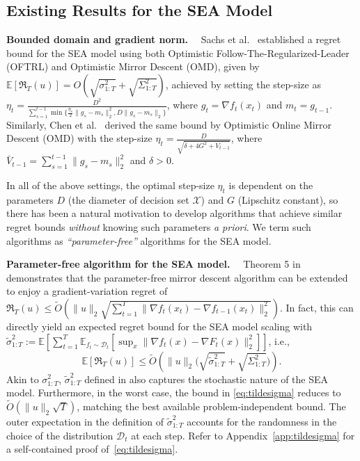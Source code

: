 \documentclass{article}
\renewcommand{\citet}{\citep}
\theoremstyle{plain}
\theoremstyle{definition}
\theoremstyle{remark}
\newcommand{\cD}{\mathcal{D}}
\newcommand{\cX}{\mathcal{X}}
\newcommand{\regret}{\mathfrak{R}}
\renewcommand{\tilde}{\widetilde}
\begin{document}
\subsection{Existing Results for the SEA Model}

\textbf{Bounded domain and gradient norm.}~~  Sachs et al.~\cite{sachs2023accelerated} established a regret bound for the SEA model using both Optimistic Follow-The-Regularized-Leader (OFTRL) and Optimistic Mirror Descent (OMD), given by $\mathbb{E}[\regret_T(u)]= O(\sqrt{\sigma_{1:T}^2}+\sqrt{\Sigma_{1:T}^2})$, achieved by setting the step-size as $\eta_t=\frac{D^2}{\sum_{s=1}^{t-1} \min\{\frac{\eta_s}{2} \|g_s - m_s\|_2^2, D \|g_s - m_s\|_2\}}$, where $g_t=\nabla f_t(x_t)$ and $m_t=g_{t-1}$. Similarly, Chen et al.~\cite{chen2024optimistic} derived the same bound by Optimistic Online Mirror Descent (OMD) with the step-size $\eta_t=\frac{D}{\sqrt{\delta+4G^2+\bar{V}_{t-1}}}$, where $\bar{V}_{t-1}=\sum_{s=1}^{t-1}\|g_s - m_s\|_2^2$ and $\delta>0$.

In all of the above settings, the optimal step-size $\eta_t$ is dependent on the parameters $D$ (the diameter of decision set $\cX$) and $G$ (Lipschitz constant), so there has been a natural motivation to develop algorithms that achieve similar regret bounds \emph{without} knowing such parameters \emph{a priori}. We term such algorithms as \emph{``parameter-free''} algorithms for the SEA model. 

\textbf{Parameter-free algorithm for the SEA model.}~~ Theorem 5 in \citet{jacobsen2022parameter} demonstrates that the parameter-free mirror descent algorithm can be extended to enjoy a gradient-variation regret of $\regret_T(u) \leq \tilde{O}(\|u\|_2 \sqrt{\sum_{t=1}^T \|\nabla f_t(x_t) - \nabla f_{t-1}(x_t)\|_2^2})$. In fact, this can directly yield an expected regret bound for the SEA model scaling with $\tilde{\sigma}_{1:T}^2 := \mathbb{E}\left[\sum_{t=1}^T \mathbb{E}_{f_t \sim \mathcal{D}_t} \left[\sup_x \|\nabla f_t(x) - \nabla F_t(x)\|_2^2\right]\right]$, i.e.,
\begin{equation}\label{eq:tildesigma}
\mathbb{E}[\regret_T(u)]\leq\tilde{O}\left(\|u\|_2 \Big(\sqrt{\tilde{\sigma}_{1:T}^2} + \sqrt{\Sigma_{1:T}^2} \Big)\right).
\end{equation}
Akin to $\sigma_{1:T}^2$, $\tilde{\sigma}_{1:T}^2$ defined in \cite{chen2024optimistic} also captures the stochastic nature of the SEA model. Furthermore, in the worst case, the bound in \eqref{eq:tildesigma} reduces to $\tilde{O}(\|u\|_2 \sqrt{T})$, matching the best available problem-independent bound. The outer expectation in the definition of $\tilde{\sigma}_{1:T}^2 $ accounts for the randomness in the choice of the distribution $\cD_t$ at each step. Refer to Appendix~\ref{app:tildesigma} for a self-contained proof of~\eqref{eq:tildesigma}.
\end{document}
